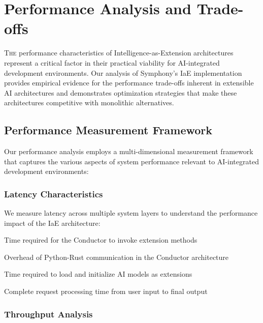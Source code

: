 
\section{Performance Analysis and Trade-offs}
\label{sec:performance-analysis}

\lettrine{T}{he} performance characteristics of Intelligence-as-Extension architectures represent a critical factor in their practical viability for AI-integrated development environments. Our analysis of Symphony's IaE implementation provides empirical evidence for the performance trade-offs inherent in extensible AI architectures and demonstrates optimization strategies that make these architectures competitive with monolithic alternatives.

\subsection{Performance Measurement Framework}

Our performance analysis employs a multi-dimensional measurement framework that captures the various aspects of system performance relevant to AI-integrated development environments:

\subsubsection{Latency Characteristics}

We measure latency across multiple system layers to understand the performance impact of the IaE architecture:

\begin{description}[leftmargin=4cm,labelwidth=3.5cm]
    \item[\textbf{Extension Call Latency}] Time required for the Conductor to invoke extension methods
    \item[\textbf{Cross-Language Latency}] Overhead of Python-Rust communication in the Conductor architecture
    \item[\textbf{Model Loading Latency}] Time required to load and initialize AI models as extensions
    \item[\textbf{End-to-End Latency}] Complete request processing time from user input to final output
\end{description}

\subsubsection{Throughput Analysis}


